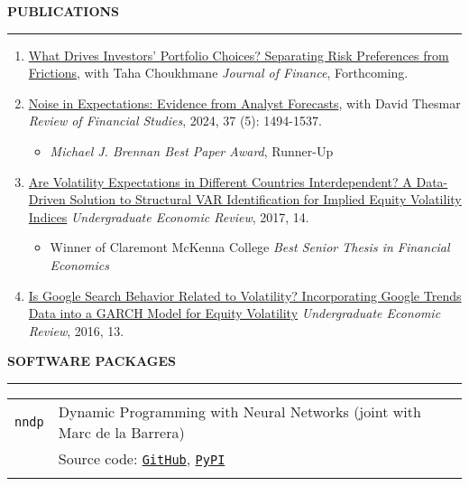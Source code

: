 \documentclass[a4paper, 10pt]{article}
\newcounter{mycounter}
\newcommand{\cvsec}[1]
{
	\needspace{2\baselineskip}
	\noindent \textbf{#1}
	
	\vspace{2pt}
	
	\hrule
	
	\bigskip
}
\newcommand{\cvitem}[2]{#1 & #2 \\ & \\}
\newenvironment{cvchrono}[1]
{
	\cvsec{#1}
	\begin{tabu} to \linewidth {X[1,l]X[6,l]} 
}
{
	\end{tabu}
}
\newenvironment{cvcontinue}[1]
{
	\cvsec{#1}
	\begin{enumerate}
		\setcounter{enumi}{\themycounter}
	}
	{
	\setcounter{mycounter}{\theenumi}
	\end{enumerate}
}
\begin{document}
\begin{cvcontinue}{PUBLICATIONS}
	\item \href{https://www.timdesilva.me/files/papers/preferences_frictions.pdf}{What Drives Investors' Portfolio Choices? Separating Risk Preferences from Frictions}, with Taha Choukhmane \newline \emph{Journal of Finance}, Forthcoming.
	\item \href{https://www.timdesilva.me/files/papers/noise_expectations.pdf}{Noise in Expectations: Evidence from Analyst Forecasts}, with David Thesmar \newline \emph{Review of Financial Studies}, 2024, 37 (5): 1494-1537.
	\begin{itemize}
		\item \emph{Michael J. Brennan Best Paper Award}, Runner-Up
	\end{itemize}
	\item \href{https://digitalcommons.iwu.edu/uer/vol14/iss1/8/}{Are Volatility Expectations in Different Countries Interdependent? A Data-Driven Solution to Structural VAR Identification for Implied Equity Volatility Indices} \newline \emph{Undergraduate Economic Review}, 2017, 14.
	\begin{itemize}
		\item Winner of Claremont McKenna College \emph{Best Senior Thesis in Financial Economics}
	\end{itemize}
	\item \href{https://digitalcommons.iwu.edu/uer/vol13/iss1/13/}{Is Google Search Behavior Related to Volatility? Incorporating Google Trends Data into a GARCH Model for Equity Volatility} \newline \emph{Undergraduate Economic Review}, 2016, 13.\\
\end{cvcontinue}

\begin{cvchrono}{SOFTWARE PACKAGES}
	\cvitem{\texttt{nndp}}{Dynamic Programming with Neural Networks (joint with Marc de la Barrera) \\
	& Source code: \href{https://github.com/marcdelabarrera/nndp}{\texttt{GitHub}}, \href{https://pypi.org/project/nndp/}{\texttt{PyPI}}
	}
\end{cvchrono}
\end{document}
